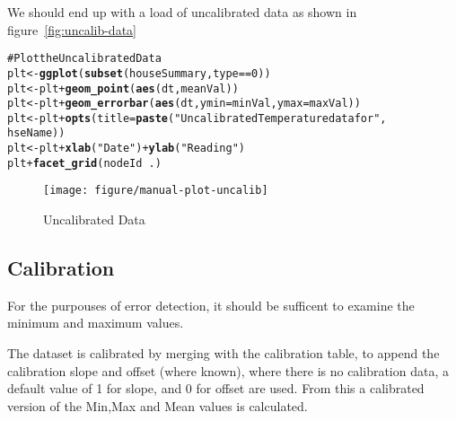 \documentclass[10pt,a4paper]{article}\usepackage{graphicx, color}
\makeatletter
\def\maxwidth{ %
  \ifdim\Gin@nat@width>\linewidth
    \linewidth
  \else
    \Gin@nat@width
  \fi
}
\newcommand{\hlfunctioncall}[1]{\textcolor[rgb]{0.501960784313725,0,0.329411764705882}{\textbf{#1}}}%
\newcommand{\hlstring}[1]{\textcolor[rgb]{0.6,0.6,1}{#1}}%
\newcommand{\hlcomment}[1]{\textcolor[rgb]{0.180392156862745,0.6,0.341176470588235}{#1}}%
\newenvironment{kframe}{%
 \def\at@end@of@kframe{}%
 \ifinner\ifhmode%
  \def\at@end@of@kframe{\end{minipage}}%
  \begin{minipage}{\columnwidth}%
 \fi\fi%
 \def\FrameCommand##1{\hskip\@totalleftmargin \hskip-\fboxsep
 \colorbox{shadecolor}{##1}\hskip-\fboxsep
     \hskip-\linewidth \hskip-\@totalleftmargin \hskip\columnwidth}%
 \MakeFramed {\advance\hsize-\width
   \@totalleftmargin\z@ \linewidth\hsize
   \@setminipage}}%
 {\par\unskip\endMakeFramed%
 \at@end@of@kframe}
\newenvironment{knitrout}{}{} %
\makeatother
\begin{document}
We should end up with a load of uncalibrated data as shown in figure~\ref{fig:uncalib-data}
\begin{knitrout}
\color{fgcolor}\begin{kframe}
\begin{alltt}
\hlcomment{# Plot the Uncalibrated Data}
plt <- \hlfunctioncall{ggplot}(\hlfunctioncall{subset}(houseSummary, type == 0))
plt <- plt + \hlfunctioncall{geom_point}(\hlfunctioncall{aes}(dt, meanVal))
plt <- plt + \hlfunctioncall{geom_errorbar}(\hlfunctioncall{aes}(dt, ymin = minVal, ymax = maxVal))
plt <- plt + \hlfunctioncall{opts}(title = \hlfunctioncall{paste}(\hlstring{"Uncalibrated Temperature data for "}, 
    hseName))
plt <- plt + \hlfunctioncall{xlab}(\hlstring{"Date"}) + \hlfunctioncall{ylab}(\hlstring{"Reading"})
plt + \hlfunctioncall{facet_grid}(nodeId ~ .)
\end{alltt}
\end{kframe}\begin{figure}[h]


{\centering \texttt{[image: figure/manual-plot-uncalib]} 

}

\caption[Uncalibrated Data]{Uncalibrated Data\label{uncalib-dataplot-uncalib}}
\end{figure}


\end{knitrout}



\subsection{Calibration}
For the purpouses of error detection, it should be sufficent to examine the
minimum and maximum values.

The dataset is calibrated by merging with the calibration table, to append the
calibration slope and offset (where known), where there is no calibration data,
a default value of 1 for slope, and 0 for offset are used.  
From this a calibrated version of the Min,Max and Mean values is calculated.
\end{document}
